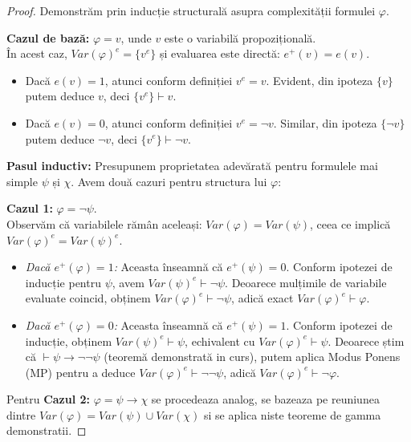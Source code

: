 \begin{proof}
    Demonstrăm prin inducție structurală asupra complexității formulei $\varphi$.

    \textbf{Cazul de bază:} $\varphi = v$, unde $v$ este o variabilă propozițională. \\
    În acest caz, $Var(\varphi)^e = \{v^e\}$ și evaluarea este directă: $e^+(v) = e(v)$.
    \begin{itemize}
        \item Dacă $e(v) = 1$, atunci conform definiției $v^e = v$. Evident, din ipoteza $\{v\}$ putem deduce $v$, deci $\{v^e\} \vdash v$.
        \item Dacă $e(v) = 0$, atunci conform definiției $v^e = \neg v$. Similar, din ipoteza $\{\neg v\}$ putem deduce $\neg v$, deci $\{v^e\} \vdash \neg v$.
    \end{itemize}

    \vspace{0.3cm}
    \textbf{Pasul inductiv:} Presupunem proprietatea adevărată pentru formulele mai simple $\psi$ și $\chi$. Avem două cazuri pentru structura lui $\varphi$:

    \textbf{Cazul 1:} $\varphi = \neg\psi$. \\
    Observăm că variabilele rămân aceleași: $Var(\varphi) = Var(\psi)$, ceea ce implică $Var(\varphi)^e = Var(\psi)^e$.
    \begin{itemize}
        \item \textit{Dacă $e^+(\varphi) = 1$:} Aceasta înseamnă că $e^+(\psi) = 0$. Conform ipotezei de inducție pentru $\psi$, avem $Var(\psi)^e \vdash \neg\psi$. Deoarece mulțimile de variabile evaluate coincid, obținem $Var(\varphi)^e \vdash \neg\psi$, adică exact $Var(\varphi)^e \vdash \varphi$.

        \item \textit{Dacă $e^+(\varphi) = 0$:} Aceasta înseamnă că $e^+(\psi) = 1$. Conform ipotezei de inducție, obținem $Var(\psi)^e \vdash \psi$, echivalent cu $Var(\varphi)^e \vdash \psi$. Deoarece știm că $\vdash \psi \to \neg\neg\psi$ (teoremă demonstrată in curs), putem aplica Modus Ponens (MP) pentru a deduce $Var(\varphi)^e \vdash \neg\neg\psi$, adică $Var(\varphi)^e \vdash \neg\varphi$.
    \end{itemize}

    \vspace{0.3cm}
    Pentru \textbf{Cazul 2:} $\varphi = \psi \to \chi$ se procedeaza analog, se bazeaza pe reuniunea dintre $Var(\varphi) = Var(\psi) \cup Var(\chi)$ si se aplica niste teoreme de gamma demonstratii.
\end{proof}


